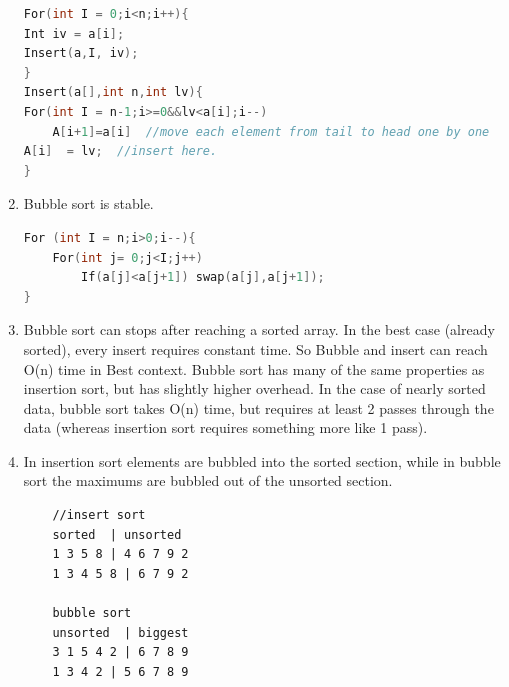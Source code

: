 \documentclass[a4paper,11pt,twoside]{book}
\begin{document}
\begin{enumerate}
\begin{lstlisting}[frame=single, language=c++]
For(int I = 0;i<n;i++){
Int iv = a[i];
Insert(a,I, iv);
}
Insert(a[],int n,int lv){
For(int I = n-1;i>=0&&lv<a[i];i--)
    A[i+1]=a[i]  //move each element from tail to head one by one
A[i]  = lv;  //insert here. 
}
\end{lstlisting}

	\item Bubble sort is stable.
\begin{lstlisting}[frame=single, language=c++]
For (int I = n;i>0;i--){
	For(int j= 0;j<I;j++)
		If(a[j]<a[j+1]) swap(a[j],a[j+1]);
}
\end{lstlisting}

	\item Bubble sort can stops after reaching a sorted array. In the best case (already sorted), every insert requires constant time. So Bubble and insert can reach O(n) time in Best context. Bubble sort has many of the same properties as insertion sort, but has slightly higher overhead. In the case of nearly sorted data, bubble sort takes O(n) time, but requires at least 2 passes through the data (whereas insertion sort requires something more like 1 pass).


	\item In insertion sort elements are bubbled into the sorted section, while in bubble sort the maximums are bubbled out of the unsorted section.

\begin{lstlisting}
	//insert sort
	sorted  | unsorted
	1 3 5 8 | 4 6 7 9 2
	1 3 4 5 8 | 6 7 9 2
	
	bubble sort
	unsorted  | biggest
	3 1 5 4 2 | 6 7 8 9
	1 3 4 2 | 5 6 7 8 9
\end{lstlisting}

\end{enumerate}  
\end{document}
